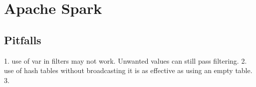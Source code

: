 \section{Apache Spark}

\subsection{Pitfalls}

1. use of var in filters may not work. Unwanted values can still pass filtering.
2. use of hash tables without broadcasting it is as effective as using an empty
table.
3.

